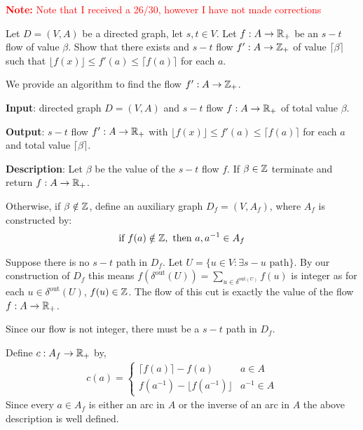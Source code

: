 \documentclass[10pt]{article}
\newcommand{\note}[1]{\textcolor{red}{\textbf{Note:} #1}}
\begin{document}
\maketitle

\note{Note that I received a 26/30, however I have not made corrections}

\begin{problem}[Problem 4.5]
    Let \( D=(V,A) \) be a directed graph, let \( s,t\in V \). Let \( f:A\to \mathbb{R}_+ \) be an \( s-t \) flow of value \( \beta \). Show that there exists and \( s-t \) flow \( f':A\to \mathbb{Z}_+ \) of value \( \lceil \beta \rceil \) such that \( \lfloor f(x) \rfloor \leq f'(a) \leq \lceil f(a) \rceil \) for each \( a \). 
\end{problem}

\begin{solution}

We provide an algorithm to find the flow \( f':A\to\mathbb{Z}_+ \).

\textbf{Input}: directed graph \( D = (V,A) \) and \( s-t \) flow \( f:A\to\mathbb{R}_+ \) of total value \( \beta \).

\textbf{Output}: \( s-t \) flow \( f':A\to\mathbb{R}_+ \) with \( \lfloor f(x) \rfloor \leq f'(a) \leq \lceil f(a) \rceil \) for each \( a \) and total value \( \lceil \beta \rceil \).

\textbf{Description}: Let \( \beta \) be the value of the \( s-t \) flow \( f \). If \( \beta\in \mathbb{Z} \) terminate and return \( f:A\to\mathbb{R}_+ \).

Otherwise, if \( \beta\notin\mathbb{Z} \), define an auxiliary graph \( D_f = (V,A_f) \), where \( A_f \) is constructed by:
\begin{align*}
    \text{if } f(a) \notin \mathbb{Z}, \text{ then } a,a^{-1} \in A_f
\end{align*}

Suppose there is no \( s-t \) path in \( D_f \). Let \( U = \{ u\in V : \exists s-u \text{ path}\} \). By our construction of \( D_f \) this means \( f(\delta^{\text{out}}(U)) = \sum_{u\in\delta^{\text{out}(U)}} f(u) \) is integer as for each \( u\in \delta^{\text{out}}(U) \), \( f(u)\in\mathbb{Z} \). The flow of this cut is exactly the value of the flow \( f:A\to\mathbb{R}_+ \).

Since our flow is not integer, there must be a \( s-t \) path in \( D_f \).

Define \( c:A_f\to\mathbb{R}_+ \) by,
\begin{align*}
    c(a) = \begin{cases}
        \lceil f(a) \rceil - f(a) & a\in A \\
        f(a^{-1}) - \lfloor f(a^{-1}) \rfloor & a^{-1} \in A
    \end{cases}  
\end{align*}
Since every \( a\in A_f \) is either an arc in \( A \) or the inverse of an arc in \( A \) the above description is well defined. 


\end{solution}
\end{document}
